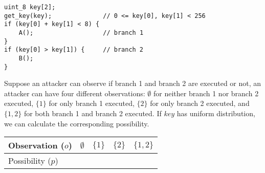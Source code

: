 \begin{lstlisting}[xleftmargin=.03\textwidth,xrightmargin=.01\textwidth]
uint_8 key[2];
get_key(key);              // 0 <= key[0], key[1] < 256
if (key[0] + key[1] < 8) {
    A();                   // branch 1
}
if (key[0] > key[1]) {     // branch 2
    B();
}
\end{lstlisting}

Suppose an attacker can observe if branch 1 and branch 2 are executed or not, 
an attacker can have four different observations:
$\emptyset$ for neither branch 1 nor branch 2 executed,
$\{1\}$ for only branch 1 executed,
$\{2\}$ for only branch 2 executed, and
 $\{1, 2\}$ for both branch 1 and branch 2 executed.
If $key$ has uniform distribution, we can calculate the corresponding
possibility.
\begin{table}[ht]
    \centering

\begin{tabular}{lllll}
    \hline
Observation ($o$)  & $\emptyset$ & ${\{1\}}$ & ${\{2\}}$ & ${\{1, 2\}}$ \\ \hline
Possibility ($p$)  &  &  &  &  \\
    \hline
\end{tabular}
\end{table}







